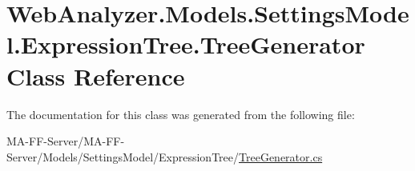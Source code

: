 \hypertarget{class_web_analyzer_1_1_models_1_1_settings_model_1_1_expression_tree_1_1_tree_generator}{}\section{Web\+Analyzer.\+Models.\+Settings\+Model.\+Expression\+Tree.\+Tree\+Generator Class Reference}
\label{class_web_analyzer_1_1_models_1_1_settings_model_1_1_expression_tree_1_1_tree_generator}


The documentation for this class was generated from the following file\+:\begin{DoxyCompactItemize}
\item 
M\+A-\/\+F\+F-\/\+Server/\+M\+A-\/\+F\+F-\/\+Server/\+Models/\+Settings\+Model/\+Expression\+Tree/\hyperlink{_tree_generator_8cs}{Tree\+Generator.\+cs}\end{DoxyCompactItemize}
